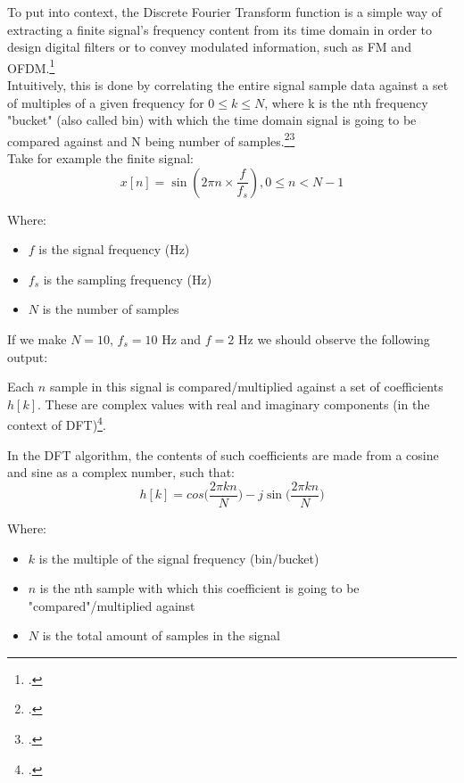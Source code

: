 To put into context, the Discrete Fourier Transform function is a simple way of extracting a finite signal's frequency content from its time domain in order to design digital filters or to convey modulated information, such as FM and OFDM.\footcite{book1_pp48_49}\\

Intuitively, this is done by correlating the entire signal sample data against a set of multiples of a given frequency for $0 \leq k \leq N$, where k is the nth frequency "bucket" (also called bin) with which the time domain signal is going to be compared against and N being number of samples.\footcite{book1_pp184_186}\footcite{book2_pp54_63}\\

Take for example the finite signal:
\[x[n] = \sin(2\pi n\times\frac{f}{f_s}), 0 \leq n < N-1 \]

Where:
\begin{itemize}
\item $f$ is the signal frequency (Hz)
\item $f_s$ is the sampling frequency (Hz)
\item $N$ is the number of samples
\end{itemize}

If we make $N = 10$, $f_s = 10$ Hz and  $f = 2$ Hz we should observe the following output:

\begin{center}
\end{center}

Each $n$ sample in this signal is compared/multiplied against a set of coefficients $h[k]$. These are complex values with real and imaginary components (in the context of DFT)\footcite{book1_pp56_60}.

In the DFT algorithm, the contents of such coefficients are made from a cosine and sine as a complex number, such that:
\[h[k] = cos\Big(\frac{2\pi kn}{N}\Big) - j\sin\Big(\frac{2\pi kn}{N}\Big)\]

Where:
\begin{itemize}
\item $k$ is the multiple of the signal frequency (bin/bucket)
\item $n$ is the nth sample with which this coefficient is going to be "compared"/multiplied against
\item $N$ is the total amount of samples in the signal
\end{itemize}

